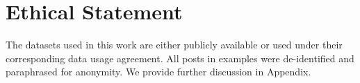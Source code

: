 \section{Ethical Statement}

The datasets used in this work are either publicly available or used under their corresponding data usage agreement. All posts in examples were de-identified and paraphrased for anonymity. We provide further discussion in Appendix. 